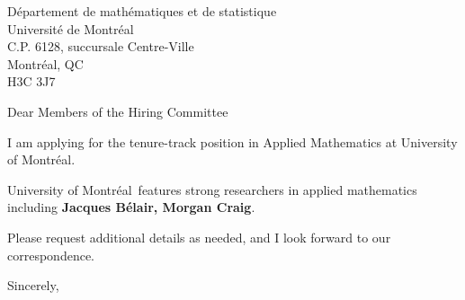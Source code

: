 




	
	
	\def\School{University of Montréal}
	
	\begin{letter}
		{Département de mathématiques et de statistique\\
			Université de Montréal\\
			C.P. 6128, succursale Centre-Ville\\
			Montréal, QC\\
			H3C 3J7
			
		}
		
		\opening{Dear Members of the Hiring Committee}
		
		
		I am applying for the tenure-track position in Applied Mathematics at \School. 
		
		\School~features strong researchers in applied mathematics including \textbf{Jacques Bélair, Morgan Craig}. 
		
		
		
		
		
		Please request additional details as needed, and I look forward to our correspondence.
		
		\closing{Sincerely,}
	\end{letter}
